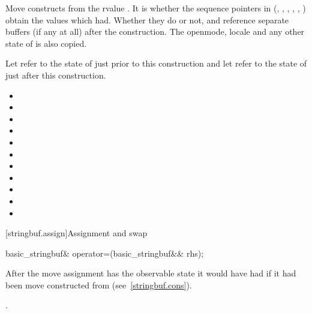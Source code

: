\begin{itemdescr}
\pnum
\effects Move constructs from the rvalue . It
is
 whether the sequence pointers in 
(, , ,
, , ) obtain
the values which  had. Whether they do or not, 
and  reference separate buffers (if any at all) after the
construction. The openmode, locale and any other state of  is
also copied.

\pnum
\ensures Let  refer to the state of
 just prior to this construction and let 
refer to the state of  just after this construction.

\begin{itemize}
\item {}
\item {}
\item {}
\item {}
\item {}
\item {}
\item {}
\item {}
\item {}
\item {}
\item {}
\end{itemize}
\end{itemdescr}

[stringbuf.assign]{Assignment and swap}

%
\begin{itemdecl}
basic_stringbuf& operator=(basic_stringbuf&& rhs);
\end{itemdecl}

\begin{itemdescr}
\pnum
\effects After the move assignment  has the observable state it would
have had if it had been move constructed from  (see~\ref{stringbuf.cons}).

\pnum
\returns {}.
\end{itemdescr}

